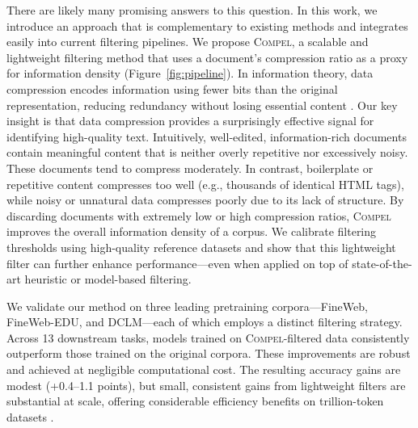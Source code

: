 There are likely many promising answers to this question.
In this work, we introduce an approach that is complementary to existing methods and integrates easily into current filtering pipelines.
We propose \textsc{Compel}, a scalable and lightweight filtering method that uses a document's compression ratio as a proxy for information density (Figure~\ref{fig:pipeline}).
In information theory, data compression encodes information using fewer bits than the original representation, reducing redundancy without losing essential content \citep{shannon1948mathematical}.
Our key insight is that data compression provides a surprisingly effective signal for identifying high-quality text.
Intuitively, well-edited, information-rich documents contain meaningful content that is neither overly repetitive nor excessively noisy.
These documents tend to compress moderately.
In contrast, boilerplate or repetitive content compresses too well (e.g., thousands of identical HTML tags), while noisy or unnatural data compresses poorly due to its lack of structure.
By discarding documents with extremely low or high compression ratios, \textsc{Compel} improves the overall information density of a corpus.
We calibrate filtering thresholds using high-quality reference datasets and show that this lightweight filter can further enhance performance---even when applied on top of state-of-the-art heuristic or model-based filtering.

We validate our method on three leading pretraining corpora---FineWeb, FineWeb-EDU, and DCLM---each of which employs a distinct filtering strategy.
Across 13 downstream tasks, models trained on \textsc{Compel}-filtered data consistently outperform those trained on the original corpora.
These improvements are robust and achieved at negligible computational cost.
The resulting accuracy gains are modest (+0.4--1.1 points), but small, consistent gains from lightweight filters are substantial at scale, offering considerable efficiency benefits on trillion-token datasets \citep{raffel2020exploring, wenzek2020ccnet, ankner2024perplexed}.

